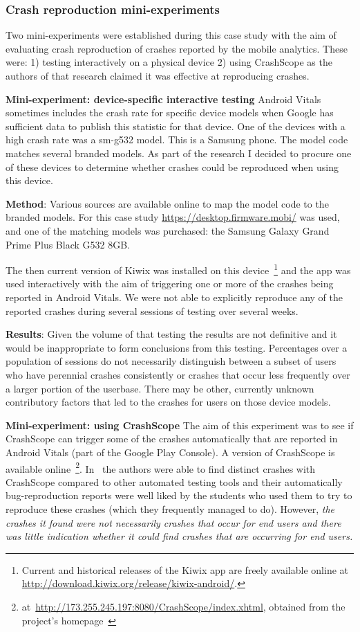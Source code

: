 \subsubsection{Crash reproduction mini-experiments} 
Two mini-experiments were established during this case study with the aim of evaluating crash reproduction of crashes reported by the mobile analytics. These were: 1) testing interactively on a physical device 2) using CrashScope as the authors of that research claimed it was effective at reproducing crashes.

\textbf{Mini-experiment: device-specific interactive testing} 
Android Vitals sometimes includes the crash rate for specific device models when Google has sufficient data to publish this statistic for that device. One of the devices with a high crash rate was a sm-g532 model. This is a Samsung phone. The model code matches several branded models. As part of the research I decided to procure one of these devices to determine whether crashes could be reproduced when using this device.  

\textbf{Method}: Various sources are available online to map the model code to the branded models. For this case study \url{https://desktop.firmware.mobi/} was used, and one of the matching models was purchased: the Samsung Galaxy Grand Prime Plus Black G532 8GB. 

The then current version of Kiwix was installed on this device~\footnote{Current and historical releases of the Kiwix app are freely available online at \url{http://download.kiwix.org/release/kiwix-android/}.} and the app was used interactively with the aim of triggering one or more of the crashes being reported in Android Vitals. We were not able to explicitly reproduce any of the reported crashes during several sessions of testing over several weeks. 

\textbf{Results}: Given the volume of that testing the results are not definitive and it would be inappropriate to form conclusions from this testing. Percentages over a population of sessions do not necessarily distinguish between a subset of users who have perennial crashes consistently or crashes that occur less frequently over a larger portion of the userbase. There may be other, currently unknown contributory factors that led to the crashes for users on those device models.

\textbf{Mini-experiment: using CrashScope}
The aim of this experiment was to see if CrashScope can trigger some of the crashes automatically that are reported in Android Vitals (part of the Google Play Console). A version of CrashScope is available online~\footnote{at~\url{http://173.255.245.197:8080/CrashScope/index.xhtml}, obtained from the project's homepage~\citep{crashscope_project_homepage}}. In~\citep{moran2016_automatically_drr_android_app_crashes} the authors were able to find distinct crashes with CrashScope compared to other automated testing tools and their automatically bug-reproduction reports were well liked by the students who used them to try to reproduce these crashes (which they frequently managed to do). However, \textit{the crashes it found were not necessarily crashes that occur for end users and there was little indication whether it could find crashes that are occurring for end users.} 

